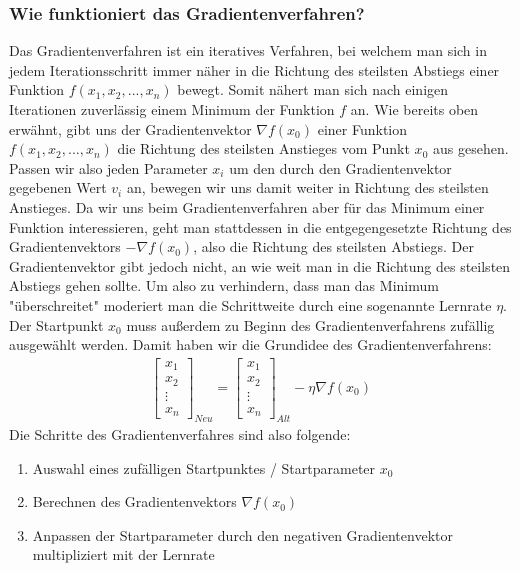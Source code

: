 \subsubsection{Wie funktioniert das Gradientenverfahren?}\label{subsec:gradientenverfahren:wie_funktioniert}
  Das Gradientenverfahren ist ein iteratives Verfahren, bei welchem man sich in jedem Iterationsschritt immer näher in die Richtung des
  steilsten Abstiegs einer Funktion $f(x_{1}, x_{2}, ... , x_{n})$ bewegt. Somit nähert man sich nach einigen Iterationen zuverlässig einem Minimum der Funktion $f$ an.
  \bigbreak\noindent
  Wie bereits oben erwähnt, gibt uns der Gradientenvektor $\nabla f(x_{0})$ einer Funktion $f(x_{1}, x_{2}, ... , x_{n})$ die Richtung des steilsten Anstieges vom Punkt $x_0$ aus gesehen.
  Passen wir also jeden Parameter $x_{i}$ um den durch den Gradientenvektor gegebenen Wert $v_{i}$ an, bewegen wir uns damit weiter in Richtung des steilsten Anstieges. 
  Da wir uns beim Gradientenverfahren aber für das Minimum einer Funktion interessieren, geht man stattdessen in die entgegengesetzte Richtung
  des Gradientenvektors $-\nabla f(x_{0})$, also die Richtung des steilsten Abstiegs. Der Gradientenvektor gibt jedoch nicht, an wie weit man in die Richtung des steilsten 
  Abstiegs gehen sollte. Um also zu verhindern, dass man das Minimum "überschreitet" moderiert man die Schrittweite durch eine sogenannte Lernrate $\eta$.
  Der Startpunkt $x_{0}$ muss außerdem zu Beginn des Gradientenverfahrens zufällig ausgewählt werden.
  Damit haben wir die Grundidee des Gradientenverfahrens: 
  \begin{align*}
    \begin{bmatrix}
          x_{1}\\
          x_{2}\\
          \vdots \\
          x_{n}
         \end{bmatrix}_{Neu} = \begin{bmatrix}
          x_{1}\\
          x_{2}\\
          \vdots \\
          x_{n}
         \end{bmatrix}_{Alt} - \eta \nabla f(x_{0})
  \end{align*}
  \noindent
  Die Schritte des Gradientenverfahres sind also folgende: 
  \begin{enumerate}
    \item Auswahl eines zufälligen Startpunktes / Startparameter $x_{0}$
    \item Berechnen des Gradientenvektors $\nabla f(x_{0})$
    \item Anpassen der Startparameter durch den negativen Gradientenvektor multipliziert mit der Lernrate
  \end{enumerate}
